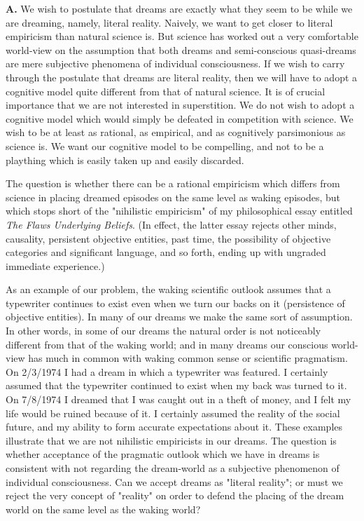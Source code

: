 \documentclass[10pt,twoside,draft]{memoir}
\newcommand{\essaytitle}[1]{
	\emph{#1}}
\begin{document}
{{\textbf{A.} We wish to postulate that dreams are exactly what they seem to be 
while we are dreaming, namely, literal reality. Naively, we want to get closer 
to literal empiricism than natural science is. But science has worked out a 
very comfortable world-view on the assumption that both dreams and 
semi-conscious quasi-dreams are mere subjective phenomena of individual 
consciousness. If we wish to carry through the postulate that dreams are 
literal reality, then we will have to adopt a cognitive model quite different 
from that of natural science. It is of crucial importance that we are not 
interested in superstition. We do not wish to adopt a cognitive model which 
would simply be defeated in competition with science. We wish to be at least 
as rational, as empirical, and as cognitively parsimonious as science is. We 
want our cognitive model to be compelling, and not to be a plaything which 
is easily taken up and easily discarded. 

The question is whether there can be a rational empiricism which 
differs from science in placing dreamed episodes on the same level as waking 
episodes, but which stops short of the "nihilistic empiricism" of my 
philosophical essay entitled \essaytitle{The Flaws Underlying Beliefs}. (In effect, the 
latter essay rejects other minds, causality, persistent objective entities, past 
time, the possibility of objective categories and significant language, and so 
forth, ending up with ungraded immediate experience.) 

As an example of our problem, the waking scientific outlook assumes 
that a typewriter continues to exist even when we turn our backs on it 
(persistence of objective entities). In many of our dreams we make the same 
sort of assumption. In other words, in some of our dreams the natural order 
is not noticeably different from that of the waking world; and in many 
dreams our conscious world-view has much in common with waking 
common sense or scientific pragmatism. On 2/3/1974 I had a dream in which 
a typewriter was featured. I certainly assumed that the typewriter continued 
to exist when my back was turned to it. On 7/8/1974 I dreamed that I was 
caught out in a theft of money, and I felt my life would be ruined because of 
it. I certainly assumed the reality of the social future, and my ability to form 
accurate expectations about it. These examples illustrate that we are not 
nihilistic empiricists in our dreams. The question is whether acceptance of 
the pragmatic outlook which we have in dreams is consistent with not 
regarding the dream-world as a subjective phenomenon of individual 
consciousness. Can we accept dreams as "literal reality"; or must we reject 
the very concept of "reality" on order to defend the placing of the dream 
world on the same level as the waking world? 

}}
\end{document}
